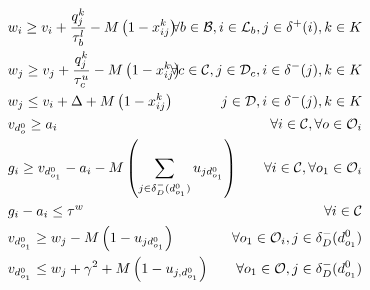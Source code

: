 \documentclass{article}
\begin{document}
\begin{alignat}{3}
    \label{mod:c5}         & w_{i} \geq v_{i}  + \frac{q^k_j}{\tau^l_b} -M\left(1- x^{k}_{ij}\right)                                                                                                                                                                                                                          & \hspace{-20mm} \forall  b \in \mathcal{B},  i \in \mathcal{L}_{b},  j \in \delta^{+}(i), k \in K \\
    \label{mod:c6}         & w_{j} \geq v_{j}  + {  \frac{q^k_j}{\tau^u_c} -M\left(1- x^{k}_{ij}\right) }                                                                                                                                                                                                                     & \hspace{-20mm}  \forall c \in  \mathcal{C}, j \in \mathcal{D}_{c}, i \in \delta^{-}(j),  k \in K \\
    \label{mod:c7}         & w_{j} \leq v_{i}  + \Delta + M\left(1- x^{k}_{ij}\right)                                                                                                                                                                                                                                         & \hspace{-20mm}   j \in \mathcal{D},  i \in \delta^{-}(j),  k \in K                               \\
    \label{mod:c8}         & v_{d^0_{o}} \geq a_i    & \hspace{-20mm} \forall  i \in \mathcal{C}, \forall o \in \mathcal{O}_i                           \\
    \label{mod:c9}  & g_{i} \geq v_{d^0_{o_1}} - a_i - M\left(  \sum_{ j \in \delta^{-}_{D}(d^0_{o_1})  }{u_{jd^0_{o_1}}}\right)  & \hspace{-20mm}  \forall  i \in \mathcal{C}, \forall o_1 \in \mathcal{O}_i   \\
    \label{mod:c91}  & g_{i} - a_i \leq \tau^w  & \hspace{-20mm}  \forall  i \in \mathcal{C}  \\
    \label{mod:c101}       & v_{d^0_{o_1}} \geq w_j - M\left(1- u_{jd^0_{o_1}}\right)   & \hspace{-40mm}    \forall o_1 \in \mathcal{O}_i,  j \in \delta_{D}^{-}(d^0_{o_1})                \\
    \label{mod:c10}        & v_{d^0_{o_1}}  \leq  w_j + \gamma^2 + M\left(1- u_{j,d^0_{o_1}}\right)                                                                                                                                                                                                                           & \hspace{-20mm}  \forall  o_1 \in \mathcal{O},  j \in \delta_{D}^{-}(d^0_{o_1})                   \\

\end{alignat}
\end{document}
